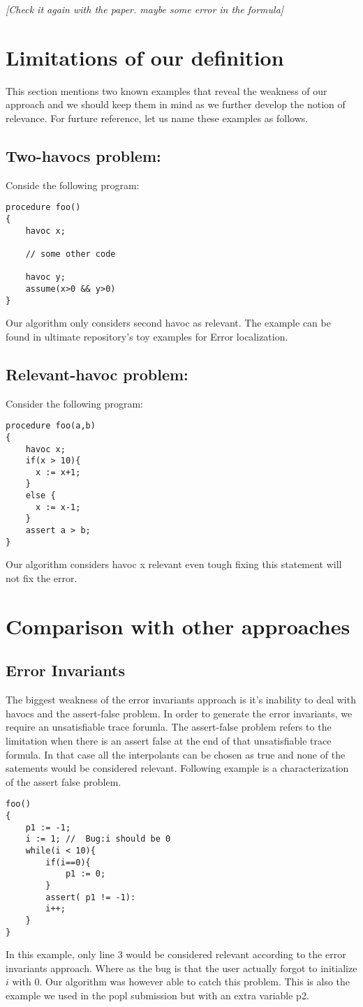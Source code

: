 \documentclass{article}
\begin{document}
\textit{[Check it again with the paper. maybe some error in the formula]}
\newpage
\section{Limitations of our definition}
This section mentions two known examples that reveal the weakness of our approach and we should keep them in mind as we further develop the notion of relevance. For furture reference, let us name these examples as follows.
\subsection{Two-havocs problem:}
Conside the following program:
\begin{lstlisting}
procedure foo()
{
	havoc x;
	
	// some other code	
	
	havoc y;
	assume(x>0 && y>0)
}
\end{lstlisting}
Our algorithm only considers second havoc as relevant. The example can be found in ultimate repository's toy examples for Error localization.

\subsection{Relevant-havoc problem:}
Consider the following program:
\begin{lstlisting}
procedure foo(a,b)
{
    havoc x;
    if(x > 10){
      x := x+1;
    }
    else {
      x := x-1;
    }
    assert a > b;
}
\end{lstlisting}
Our algorithm considers havoc x relevant even tough fixing this statement will not fix the error.

\section{Comparison with other approaches}
\subsection{Error Invariants}
The biggest weakness of the error invariants approach \cite{errorinvariants} is it's inability to deal with havocs and the assert-false problem. In order to generate the error invariants, we require an unsatisfiable trace forumla.  The assert-false problem refers to the limitation when there is an assert false at the end of that unsatisfiable trace formula. In that case all the interpolants can be chosen as true and none of the satements would be considered relevant. Following example is a characterization of the assert false problem.
\begin{lstlisting}
foo()
{ 
	p1 := -1;
	i := 1; //  Bug:i should be 0
	while(i < 10){
		if(i==0){
			p1 := 0;		
		}
		assert( p1 != -1):
		i++;	
	}
}
\end{lstlisting}
In this example, only line 3 would be considered relevant according to the error invariants approach. Where as the bug is that the user actually forgot to initialize $i$ with 0. Our algorithm was however able to catch this problem. This is also the example we used in the popl submission but with an extra variable p2.
\end{document}
